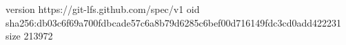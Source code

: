 version https://git-lfs.github.com/spec/v1
oid sha256:db03c6f69a700fdbcade57c6a8b79d6285c6bef00d716149fdc3cd0add422231
size 213972
